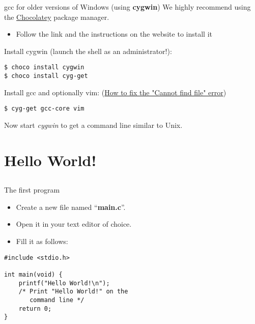 \begin{frame}[fragile = singleslide]{gcc for older versions of Windows (using \textbf{cygwin})}
	We highly recommend using the \href{https://chocolatey.org/}{Chocolatey} package manager.\\
	\begin{itemize}
		\item Follow the link and the instructions on the website to install it
	\end{itemize}
	\bigskip
	Install cygwin (launch the shell as an administrator!):
	
	\begin{lstlisting}[numbers=none]
$ choco install cygwin
$ choco install cyg-get
    \end{lstlisting}
    
	\bigskip
	Install gcc and optionally vim: {\scriptsize(\href{https://github.com/chocolatey/chocolatey-coreteampackages/issues/176#issuecomment-212939458}{How to fix the "Cannot find file" error})}
	
	\begin{lstlisting}[numbers=none]
$ cyg-get gcc-core vim
    \end{lstlisting}
	\bigskip
	Now start \textit{cygwin} to get a command line similar to Unix.
\end{frame}

\section{Hello World!}
\subsection{}

\begin{frame}[fragile = singleslide]{The first program}
	\begin{itemize}
		\item Create a new file named ``\textbf{main.c}''.
		\item Open it in your text editor of choice.
		\item Fill it as follows:
	\end{itemize}
	
	\begin{lstlisting}
#include <stdio.h>

int main(void) {
	printf("Hello World!\n");
	/* Print "Hello World!" on the
	   command line */
	return 0;
}
\end{lstlisting}

\end{frame}

